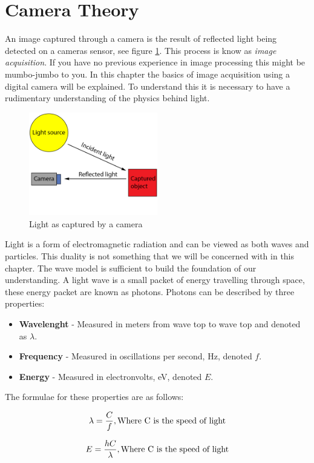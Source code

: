 \section{Camera Theory}

An image captured through a camera is the result of reflected light being detected on a cameras sensor, see figure \ref{fig:light_cam}. This process is know as \textit{image acquisition}. If you have no previous experience in image processing this might be mumbo-jumbo to you. In this chapter the basics of image acquisition using a digital camera will be explained. To understand this it is necessary to have a rudimentary understanding of the physics behind light.

\begin{figure}[htbp] 
\centering 
\includegraphics[width=0.5\textwidth]{Pictures/Theory/light_from_sun.png} 
\caption{Light as captured by a camera} 
\label{fig:light_cam} 
\end{figure}

Light is a form of electromagnetic radiation and can be viewed as both waves and particles. This duality is not something that we will be concerned with in this chapter. The wave model is sufficient to build the foundation of our understanding. A light wave is a small packet of energy travelling through space, these energy packet are known as photons. Photons can be described by three properties:

\begin{itemize}
\item \textbf{Wavelenght} - Measured in meters from wave top to wave top and denoted as $\lambda$.
\item \textbf{Frequency} - Measured in oscillations per second, Hz, denoted $f$.
\item \textbf{Energy} - Measured in electronvolts, eV, denoted $E$.
\end{itemize}

The formulae for these properties are as follows:

\begin{align}
\centering 
\lambda = \frac{C}{f}, \text{Where C is the speed of light}
\label{eq:wavelenght} 
\end{align}

\begin{align}
\centering
E = \frac{hC}{\lambda}, \text{Where C is the speed of light}
\label{eq:e_v} 
\end{align}

 


